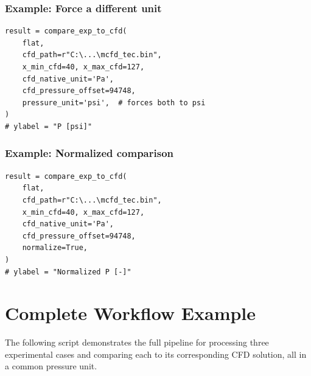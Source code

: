 \documentclass[11pt, letterpaper]{article}
\begin{document}
\subsubsection*{Example: Force a different unit}

\begin{lstlisting}[caption={Override to compare in psi.}]
result = compare_exp_to_cfd(
    flat,
    cfd_path=r"C:\...\mcfd_tec.bin",
    x_min_cfd=40, x_max_cfd=127,
    cfd_native_unit='Pa',
    cfd_pressure_offset=94748,
    pressure_unit='psi',  # forces both to psi
)
# ylabel = "P [psi]"
\end{lstlisting}

\subsubsection*{Example: Normalized comparison}

\begin{lstlisting}[caption={Normalized overlay.}]
result = compare_exp_to_cfd(
    flat,
    cfd_path=r"C:\...\mcfd_tec.bin",
    x_min_cfd=40, x_max_cfd=127,
    cfd_native_unit='Pa',
    cfd_pressure_offset=94748,
    normalize=True,
)
# ylabel = "Normalized P [-]"
\end{lstlisting}

\newpage
\section{Complete Workflow Example}
\label{sec:workflow}

The following script demonstrates the full pipeline for processing three
experimental cases and comparing each to its corresponding CFD solution,
all in a common pressure unit.
\end{document}

